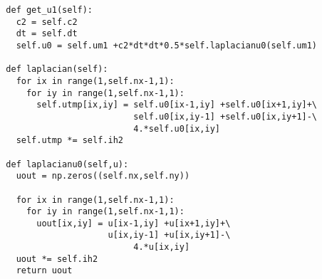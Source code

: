 \documentclass[10pt]{article}
\begin{document}
\begin{verbatim}
  def get_u1(self):
    c2 = self.c2
    dt = self.dt
    self.u0 = self.um1 +c2*dt*dt*0.5*self.laplacianu0(self.um1)
  
  def laplacian(self):
    for ix in range(1,self.nx-1,1):
      for iy in range(1,self.nx-1,1):
        self.utmp[ix,iy] = self.u0[ix-1,iy] +self.u0[ix+1,iy]+\
                           self.u0[ix,iy-1] +self.u0[ix,iy+1]-\
                           4.*self.u0[ix,iy]
    self.utmp *= self.ih2

  def laplacianu0(self,u):
    uout = np.zeros((self.nx,self.ny))

    for ix in range(1,self.nx-1,1):
      for iy in range(1,self.nx-1,1):
        uout[ix,iy] = u[ix-1,iy] +u[ix+1,iy]+\
                      u[ix,iy-1] +u[ix,iy+1]-\
                           4.*u[ix,iy]
    uout *= self.ih2
    return uout
\end{verbatim}
\end{document}
